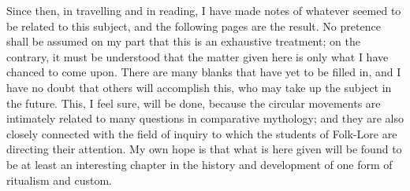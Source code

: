 \documentclass[a4paper, 11pt, oneside, polutonikogreek, english]{article}
\begin{document}
Since then, in travelling and in reading, I have made notes of whatever seemed to be related to this subject, and the following pages are the result. No pretence shall be assumed on my part that this is an exhaustive treatment; on the contrary, it must be understood that the matter given here is only what I have chanced to come upon. There are many blanks that have yet to be filled in, and I have no doubt that others will accomplish this, who may take up the subject in the future. This, I feel sure, will be done, because the circular movements are intimately related to many questions in comparative mythology; and they are also closely connected with the field of inquiry to which the students of Folk-Lore are directing their attention. My own hope is that what is here given will be found to be at least an interesting chapter in the history and development of one form of ritualism and custom.
\end{document}
